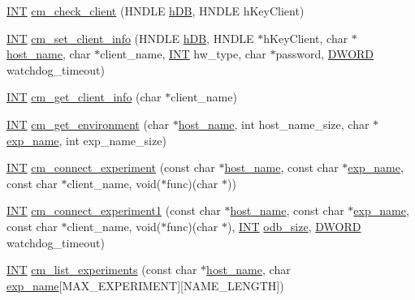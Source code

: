 \begin{DoxyCompactItemize}
\hyperlink{vppg_8h_a392e62da233ed3e2f7c3fd4f487a3896}{INT} \hyperlink{group__cmfunctionc_ga43f5554b3e5296a0f92ec3d6aa15ed30}{cm\_\-check\_\-client} (HNDLE \hyperlink{mevb_8c_ab1f60c53f74e806a3b9f687af38d7421}{hDB}, HNDLE hKeyClient)
\item 
\hyperlink{vppg_8h_a392e62da233ed3e2f7c3fd4f487a3896}{INT} \hyperlink{group__cmfunctionc_gae50ca92a705efaed76dd1204a3caa32e}{cm\_\-set\_\-client\_\-info} (HNDLE \hyperlink{mevb_8c_ab1f60c53f74e806a3b9f687af38d7421}{hDB}, HNDLE $\ast$hKeyClient, char $\ast$\hyperlink{mevb_8c_af65cc3664520b7cd0817adc7106f9624}{host\_\-name}, char $\ast$client\_\-name, \hyperlink{vppg_8h_a392e62da233ed3e2f7c3fd4f487a3896}{INT} hw\_\-type, char $\ast$password, \hyperlink{vt2_8h_a798af1e30bc65f319c1a246cecf59e39}{DWORD} watchdog\_\-timeout)
\item 
\hyperlink{vppg_8h_a392e62da233ed3e2f7c3fd4f487a3896}{INT} \hyperlink{group__cmfunctionc_ga0aa3002f758a710360b90a50500fc784}{cm\_\-get\_\-client\_\-info} (char $\ast$client\_\-name)
\item 
\hyperlink{vppg_8h_a392e62da233ed3e2f7c3fd4f487a3896}{INT} \hyperlink{group__cmfunctionc_gaa483e7c17ff962fd6cdfa581f4989f54}{cm\_\-get\_\-environment} (char $\ast$\hyperlink{mevb_8c_af65cc3664520b7cd0817adc7106f9624}{host\_\-name}, int host\_\-name\_\-size, char $\ast$\hyperlink{mfe_8c_a11eee1a5e2cef985b90bdfe0bfc8cf76}{exp\_\-name}, int exp\_\-name\_\-size)
\item 
\hyperlink{vppg_8h_a392e62da233ed3e2f7c3fd4f487a3896}{INT} \hyperlink{group__cmfunctionc_ga1e96495bb5b89e4ea770a1ea7bc7787b}{cm\_\-connect\_\-experiment} (const char $\ast$\hyperlink{mevb_8c_af65cc3664520b7cd0817adc7106f9624}{host\_\-name}, const char $\ast$\hyperlink{mfe_8c_a11eee1a5e2cef985b90bdfe0bfc8cf76}{exp\_\-name}, const char $\ast$client\_\-name, void($\ast$func)(char $\ast$))
\item 
\hyperlink{vppg_8h_a392e62da233ed3e2f7c3fd4f487a3896}{INT} \hyperlink{group__cmfunctionc_ga4dfbe7e4683c5f1e7f7cc1f6f998bdda}{cm\_\-connect\_\-experiment1} (const char $\ast$\hyperlink{mevb_8c_af65cc3664520b7cd0817adc7106f9624}{host\_\-name}, const char $\ast$\hyperlink{mfe_8c_a11eee1a5e2cef985b90bdfe0bfc8cf76}{exp\_\-name}, const char $\ast$client\_\-name, void($\ast$func)(char $\ast$), \hyperlink{vppg_8h_a392e62da233ed3e2f7c3fd4f487a3896}{INT} \hyperlink{analyzer_8c_a7503268889a084b74a968787ffc025b7}{odb\_\-size}, \hyperlink{vt2_8h_a798af1e30bc65f319c1a246cecf59e39}{DWORD} watchdog\_\-timeout)
\item 
\hyperlink{vppg_8h_a392e62da233ed3e2f7c3fd4f487a3896}{INT} \hyperlink{group__cmfunctionc_gad7e8e8d4f9d89c17133b09505539b351}{cm\_\-list\_\-experiments} (const char $\ast$\hyperlink{mevb_8c_af65cc3664520b7cd0817adc7106f9624}{host\_\-name}, char \hyperlink{mfe_8c_a11eee1a5e2cef985b90bdfe0bfc8cf76}{exp\_\-name}\mbox{[}MAX\_\-EXPERIMENT\mbox{]}\mbox{[}NAME\_\-LENGTH\mbox{]})

\end{DoxyCompactItemize}

